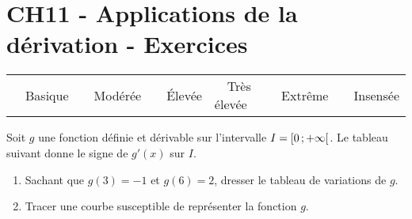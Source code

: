 \documentclass[a4paper,11pt]{article}
\author{Pierquet}
\title{\nomfichier}
\begin{document}
\pagestyle{fancy}

\part{CH11 - Applications de la dérivation - Exercices}

\medskip

\begin{caide}
	{\setlength\arrayrulewidth{1.5pt} 
		\begin{tabularx}{\linewidth}{Y|Y|Y|Y|Y|Y}
			~~\textsf{Basique} & ~~\textsf{Modérée} & ~~\textsf{Élevée} & ~~\textsf{Très élevée} & ~~\textsf{Extrême} & ~~\textsf{Insensée} \\
	\end{tabularx}}
\end{caide}


\medskip

Soit $g$ une fonction définie et dérivable sur l'intervalle $I=\mbox{\ensuremath{\left[0\mathpunct{};+\infty\right[}}$. Le tableau suivant donne le signe de $g'(x)$ sur $I$.
\begin{center}
\end{center}
\begin{enumerate}
	\item Sachant que $g(3)=-1$ et $g(6)=2$, dresser le tableau de variations de $g$.
	\item Tracer une courbe susceptible de représenter la fonction $g$.
\end{enumerate}

\medskip


\medskip
\end{document}
